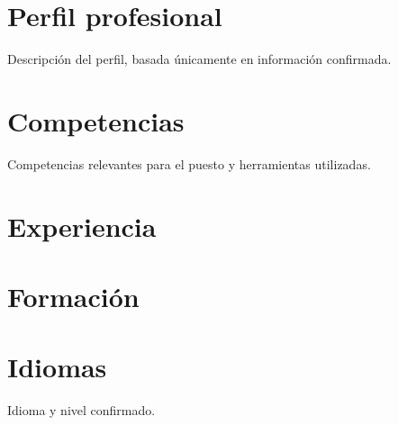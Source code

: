 \documentclass[11pt,a4paper,sans]{moderncv}
\begin{document}
\makecvtitle
\section{Perfil profesional}
Descripción del perfil, basada únicamente en información confirmada.
\section{Competencias}
Competencias relevantes para el puesto y herramientas utilizadas.
\section{Experiencia}
\section{Formación}
\section{Idiomas}
Idioma y nivel confirmado.
\end{document}
